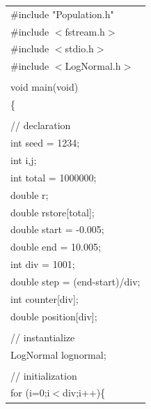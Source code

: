 {\footnotesize
\begin{center}
\begin{tabular}{|l|}\hline
\#include "Population.h"\\
\#include $<$fstream.h$>$\\
\#include $<$stdio.h$>$\\
\#include $<$LogNormal.h$>$\\
\hspace*{\textwidth}\\
void main(void)\\
\{\\
\\
\hspace*{10mm}// declaration\\
\hspace*{10mm}int seed      = 1234;\\
\hspace*{10mm}int i,j;\\
\hspace*{10mm}int total     = 1000000;\\
\hspace*{10mm}double r;\\
\hspace*{10mm}double rstore[total];\\
\hspace*{10mm}double start  = -0.005;\\
\hspace*{10mm}double end    = 10.005;\\
\hspace*{10mm}int div       =   1001;\\
\hspace*{10mm}double step   = (end-start)/div;\\
\hspace*{10mm}int counter[div];\\
\hspace*{10mm}double position[div];\\
\\
\hspace*{10mm}// instantialize\\
\hspace*{10mm}LogNormal lognormal;\\
\\
\hspace*{10mm}// initialization\\
\hspace*{10mm}for (i=0;i$<$div;i++)\{\\

\end{tabular}
\end{center}}
